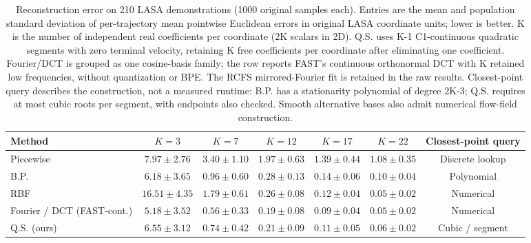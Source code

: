 \begin{table}[t]
\centering
\caption{Reconstruction error on 210 LASA demonstrations (1000 original samples each). Entries are the mean and population standard deviation of per-trajectory mean pointwise Euclidean errors in original LASA coordinate units; lower is better. K is the number of independent real coefficients per coordinate (2K scalars in 2D). Q.S. uses K-1 C1-continuous quadratic segments with zero terminal velocity, retaining K free coefficients per coordinate after eliminating one coefficient. Fourier/DCT is grouped as one cosine-basis family; the row reports FAST's continuous orthonormal DCT with K retained low frequencies, without quantization or BPE. The RCFS mirrored-Fourier fit is retained in the raw results. Closest-point query describes the construction, not a measured runtime: B.P. has a stationarity polynomial of degree 2K-3; Q.S. requires at most cubic roots per segment, with endpoints also checked. Smooth alternative bases also admit numerical flow-field construction.}
\label{tab:m1_basis}
\small
\begin{tabular}{lcccccc}
\hline
Method & $K=3$ & $K=7$ & $K=12$ & $K=17$ & $K=22$ & Closest-point query \\
\hline
Piecewise & $7.97 \pm 2.76$ & $3.40 \pm 1.10$ & $1.97 \pm 0.63$ & $1.39 \pm 0.44$ & $1.08 \pm 0.35$ & Discrete lookup \\
B.P. & $6.18 \pm 3.65$ & $0.96 \pm 0.60$ & $0.28 \pm 0.13$ & $0.14 \pm 0.06$ & $0.10 \pm 0.04$ & Polynomial \\
RBF & $16.51 \pm 4.35$ & $1.79 \pm 0.61$ & $0.26 \pm 0.08$ & $0.12 \pm 0.04$ & $0.05 \pm 0.02$ & Numerical \\
Fourier / DCT (FAST-cont.) & $5.18 \pm 3.52$ & $0.56 \pm 0.33$ & $0.19 \pm 0.08$ & $0.09 \pm 0.04$ & $0.05 \pm 0.02$ & Numerical \\
Q.S. (ours) & $6.55 \pm 3.12$ & $0.74 \pm 0.42$ & $0.21 \pm 0.09$ & $0.11 \pm 0.05$ & $0.06 \pm 0.02$ & Cubic / segment \\
\hline
\end{tabular}
\end{table}
